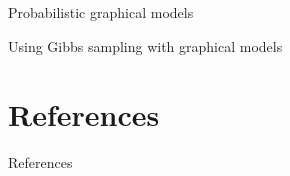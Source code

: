 \documentclass{beamer}					%
\begin{document}
\begin{frame}{Probabilistic graphical models}

\end{frame}

\begin{frame}{Using Gibbs sampling with graphical models}

\end{frame}

\section{References}

\begin{frame}[allowframebreaks]{References}
	\tiny
	
\end{frame}
\end{document}
